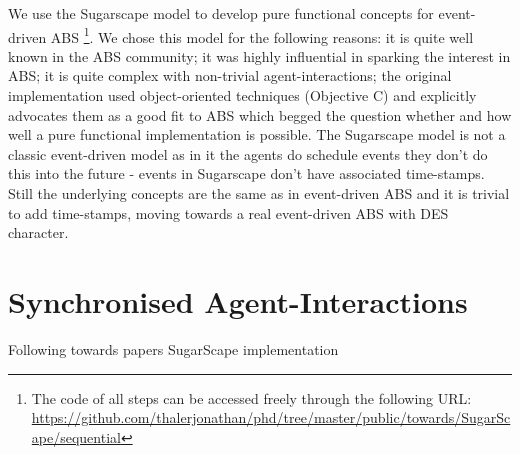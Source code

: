 We use the Sugarscape model to develop pure functional concepts for event-driven ABS \footnote{The code of all steps can be accessed freely through the following URL: \url{https://github.com/thalerjonathan/phd/tree/master/public/towards/SugarScape/sequential}}. We chose this model for the following reasons: it is quite well known in the ABS community; it was highly influential in sparking the interest in ABS; it is quite complex with non-trivial agent-interactions; the original implementation used object-oriented techniques (Objective C) and explicitly advocates them as a good fit to ABS which begged the question whether and how well a pure functional implementation is possible. The Sugarscape model is not a classic event-driven model as in it the agents do schedule events they don't do this into the future - events in Sugarscape don't have associated time-stamps. Still the underlying concepts are the same as in event-driven ABS and it is trivial to add time-stamps, moving towards a real event-driven ABS with DES character.



\section{Synchronised Agent-Interactions}
Following towards papers SugarScape implementation



